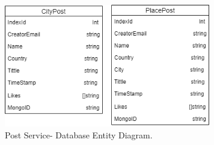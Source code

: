 \begin{figure}
	\begin{center}
		\includegraphics[width=90mm,scale=1]{img/post/post-db-entity.png}
		\caption{Post Service- Database Entity Diagram.}
		\label{post:dbentity}
	\end{center}
\end{figure}

